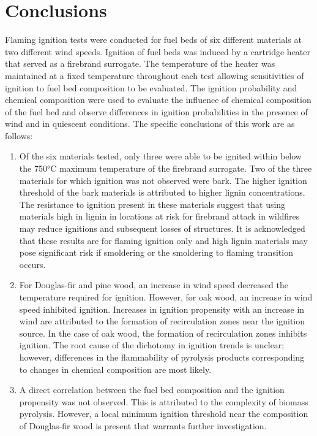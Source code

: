 \section{Conclusions}
\label{sec:conclusions3}    
    Flaming ignition tests were conducted for fuel beds of six different materials at two different wind speeds. Ignition of fuel beds was induced by a cartridge heater that served as a firebrand surrogate. The temperature of the heater was maintained at a fixed temperature throughout each test allowing sensitivities of ignition to fuel bed composition to be evaluated. The ignition probability and chemical composition were used to evaluate the influence of chemical composition of the fuel bed and observe differences in ignition probabilities in the presence of wind and in quiescent conditions. The specific conclusions of this work are as follows:
        \begin{enumerate}
            \item Of the six materials tested, only three were able to be ignited within below the 750\si{\celsius} maximum temperature of the firebrand surrogate. Two of the three materials for which ignition was not observed were bark. The higher ignition threshold of the bark materials is attributed to higher lignin concentrations. The resistance to ignition present in these materials suggest that using materials high in lignin in locations at risk for firebrand attack in wildfires may reduce ignitions and subsequent losses of structures. It is acknowledged that these results are for flaming ignition only and high lignin materials may pose significant risk if smoldering or the smoldering to flaming transition occurs.
            
            \item For Douglas-fir and pine wood, an increase in wind speed decreased the temperature required for ignition. However, for oak wood, an increase in wind speed inhibited ignition. Increases in ignition propensity with an increase in wind are attributed to the formation of recirculation zones near the ignition source. In the case of oak wood, the formation of recirculation zones inhibits ignition. The root cause of the dichotomy in ignition trends is unclear; however, differences in the flammability of pyrolysis products corresponding to changes in chemical composition are most likely.
            
            \item A direct correlation between the fuel bed composition and the ignition propensity was not observed. This is attributed to the complexity of biomass pyrolysis. However, a local minimum ignition threshold near the composition of Douglas-fir wood is present that warrants further investigation. 
        \end{enumerate}
